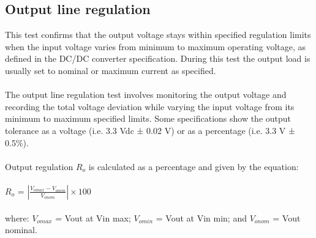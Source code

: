 \subsection{Output line regulation}

This test confirms that the output voltage stays within specified regulation limits when the input voltage varies from minimum to maximum operating voltage, as defined in the DC/DC converter specification. During this test the output load is usually set to nominal or maximum current as specified.
\\ \\
The output line regulation test involves monitoring the output voltage and recording the total voltage deviation while varying the input voltage from its minimum to maximum specified limits. Some specifications show the output tolerance as a voltage (i.e. 3.3 Vdc ± 0.02 V) or as a percentage (i.e. 3.3 V ± 0.5\%).
\\ \\
Output regulation $R_{o}$ is calculated as a percentage and given by the equation:
\\ \\
\hspace*{5cm}$R_{o}$ = $\left | \frac{V_{omax}-V_{omin}}{V_{onom}} \right | \times 100$
\\ \\
where:
$V_{omax}$ = Vout at Vin max; 
$V_{omin}$ = Vout at Vin min; and
$V_{onom}$ = Vout nominal.
\pagebreak

